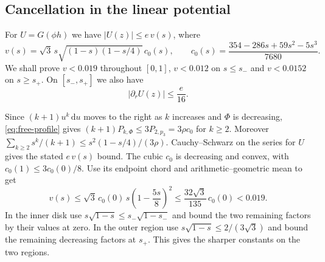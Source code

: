 \documentclass[11pt,a4paper,reqno]{amsart}
\theoremstyle{remark}
\numberwithin{equation}{section}
\newcommand{\dd}{\,\mathrm d}
\begin{document}
\subsection{Cancellation in the linear potential}
For $U=G(\phi h)$ we have $|U(z)|\le e\,v(s)$, where
\begin{equation}\label{eq:v-linear}
  v(s)=\sqrt3\,s\sqrt{(1-s)(1-s/4)}\,c_0(s),
  \qquad
  c_0(s)=\frac{354-286s+59s^2-5s^3}{7680}.
\end{equation}
We shall prove $v<0.019$ throughout $[0,1]$, $v<0.012$ on $s\le s_-$ and
$v<0.0152$ on $s\ge s_+$. On $[s_-,s_+]$ we also have
\begin{equation}\label{eq:u-slope}
  |\partial_r U(z)|\le\frac{e}{16}.
\end{equation}

Since $(k+1)u^k\dd u$ moves to the right as $k$ increases and $\Phi$ is
decreasing, \eqref{eq:free-profile} gives
$(k+1)P_{k,\Phi}\le3P_{2,p_3}=3\rho c_0$ for $k\ge2$.
Moreover $\sum_{k\ge2}s^k/(k+1)\le s^2(1-s/4)/(3\rho)$.
Cauchy--Schwarz on the series for $U$ gives the stated $e\,v(s)$ bound.
The cubic $c_0$ is decreasing and convex, with $c_0(1)\le3c_0(0)/8$.
Use its endpoint chord and arithmetic--geometric mean to get
\[
  v(s)\le\sqrt3\,c_0(0)\,s\left(1-\frac{5s}{8}\right)^2
      \le\frac{32\sqrt3}{135}\,c_0(0)<0.019.
\]
In the inner disk use $s\sqrt{1-s}\le s_-\sqrt{1-s_-}$ and bound the two
remaining factors by their values at zero. In the outer region use
$s\sqrt{1-s}\le2/(3\sqrt3)$ and bound the remaining decreasing factors
at $s_+$. This gives the sharper constants on the two regions.
\end{document}
